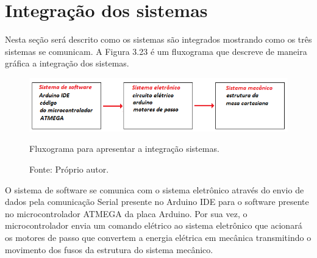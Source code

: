 \section{Integração dos sistemas}

Nesta seção será descrito como os sistemas são integrados mostrando como os três sistemas se comunicam. 
A Figura 3.23 é um fluxograma que descreve de maneira gráfica a integração dos sistemas.

\begin{figure}[!htb]
\centering
\includegraphics[scale = 0.9]{figuras/3-23}
\caption{Fluxograma para apresentar a integração sistemas.}
\caption*{Fonte: Próprio autor.}
\label{figintegracao}
\end{figure}
    
O sistema de software se comunica com o sistema eletrônico através do envio de dados pela comunicação 
Serial presente no Arduino IDE para o software presente no microcontrolador ATMEGA da placa Arduino. 
Por sua vez, o microcontrolador envia um comando elétrico ao sistema eletrônico que acionará os motores 
de passo que convertem a energia elétrica em mecânica transmitindo o movimento dos fusos da estrutura do 
sistema mecânico.